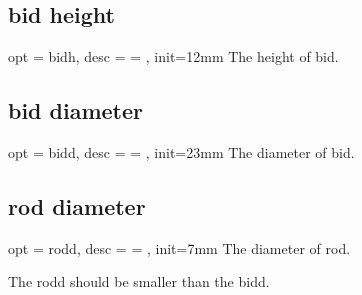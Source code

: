 \documentclass[full]{l3doc}
\begin{document}
\begin{documentation}
\subsection{bid height}

\begin{option}{ opt = bidh, desc = {= }, init=12mm }
  The height of bid.
\end{option}

\begin{SideBySideExample}[frame=single,numbers=left,%
                xrightmargin=.40\linewidth,gobble=2]
  \centering
  \begin{suanpan}
  \end{suanpan}
\end{SideBySideExample}

\subsection{bid diameter}

\begin{option}{ opt = bidd, desc = {= }, init=23mm }
  The diameter of bid.
\end{option}

\begin{SideBySideExample}[frame=single,numbers=left,%
                xrightmargin=.40\linewidth,gobble=2]
  \centering
  \begin{suanpan}
  \end{suanpan}
\end{SideBySideExample}

\subsection{rod diameter}

\begin{option}{ opt = rodd, desc = {= }, init=7mm }
  The diameter of rod.
\end{option}

\begin{noteen}
  The rodd should be smaller than the bidd.
\end{noteen}

\begin{SideBySideExample}[frame=single,numbers=left,%
                xrightmargin=.40\linewidth,gobble=2]
  \centering
  \begin{suanpan}
  \end{suanpan}
\end{SideBySideExample}


\end{documentation}
\end{document}
